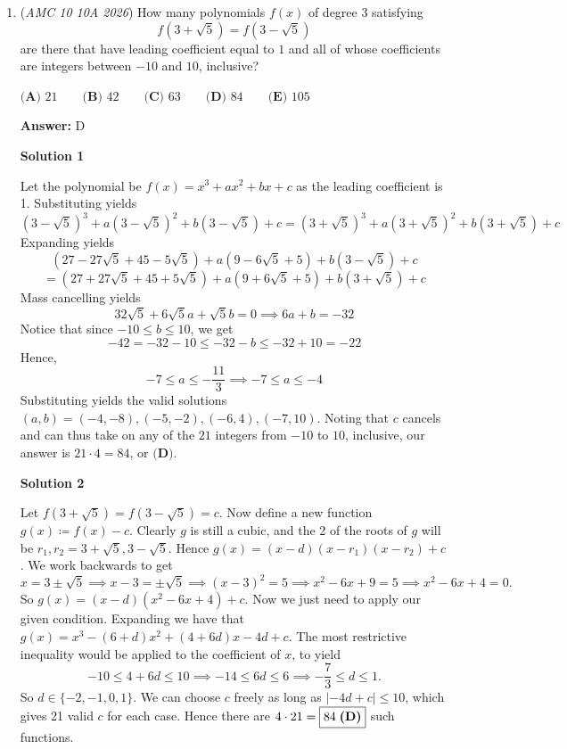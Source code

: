 \begin{enumerate}
 


 


	\item (\textit{AMC 10 10A 2026}) How many polynomials $f(x)$ of degree $3$ satisfying
 \[f\left( 3+\sqrt{5} \right) = f\left( 3 - \sqrt{5} \right)\]are there that have leading coefficient equal to $1$ and all of whose coefficients are integers between $-10$ and $10$, inclusive?


 $\textbf{(A) } 21 \qquad\textbf{(B) } 42 \qquad\textbf{(C) } 63 \qquad\textbf{(D) } 84 \qquad\textbf{(E) } 105$

 \textbf{Answer: }D



\textbf{Solution 1}

Let the polynomial be $f(x)=x^3+ax^2+bx+c$ as the leading coefficient is 1. Substituting yields
 \[\left(3-\sqrt{5}\right)^3+a\left(3-\sqrt{5}\right)^2+b\left(3-\sqrt{5}\right)+c= \left(3+\sqrt{5}\right)^3+a\left(3+\sqrt{5}\right)^2+b\left(3+\sqrt{5}\right)+c\]Expanding yields
 \[(27-27\sqrt{5}+45-5\sqrt{5})+a(9-6\sqrt{5}+5)+b(3-\sqrt{5})+c\]
 \[=(27+27\sqrt{5}+45+5\sqrt{5})+a(9+6\sqrt{5}+5)+b(3+\sqrt{5})+c\]Mass cancelling yields
 \[32\sqrt{5}+6\sqrt{5}a+\sqrt{5}b=0\implies 6a+b=-32\]Notice that since $-10\le b\le 10$, we get
 \[-42= -32-10\le -32-b\le -32+10=-22\]Hence,
 \[-7\le a\le -\frac{11}{3}\implies -7\le a\le -4\]Substituting yields the valid solutions $(a,b)=(-4,-8),(-5,-2),(-6,4),(-7,10)$. Noting that $c$ cancels and can thus take on any of the $21$ integers from $-10$ to $10$, inclusive, our answer is $21\cdot 4=84$, or $\boxed{\textbf{(D)}}$.

 



\textbf{Solution 2}

Let $f\left(3+\sqrt 5\right)=f\left(3-\sqrt 5\right)=c$. Now define a new function $g(x)\coloneqq f(x)-c$. Clearly $g$ is still a cubic, and the 2 of the roots of $g$ will be $r_1, r_2=3+\sqrt 5, 3-\sqrt 5$. Hence $g(x)=(x-d)(x-r_1)(x-r_2)+c$. We work backwards to get 
 \[x=3\pm\sqrt 5\implies x-3=\pm\sqrt 5\implies (x-3)^2=5\implies x^2-6x+9=5\implies x^2-6x+4=0.\] So $g(x)=(x-d)(x^2-6x+4)+c$. Now we just need to apply our given condition. Expanding we have that $g(x)=x^3-(6+d)x^2+(4+6d)x-4d+c$. The most restrictive inequality would be applied to the coefficient of $x$, to yield 
 \[-10\le 4+6d\le 10\implies -14\le 6d\le 6\implies -\frac73\le d\le 1.\]So $d\in\{-2, -1, 0, 1\}$. We can choose $c$ freely as long as $|-4d+c|\le 10$, which gives 21 valid $c$ for each case. Hence there are $4\cdot 21=\boxed{84\hspace{1mm}\textbf{(D)}}$ such functions. 


\end{enumerate}
